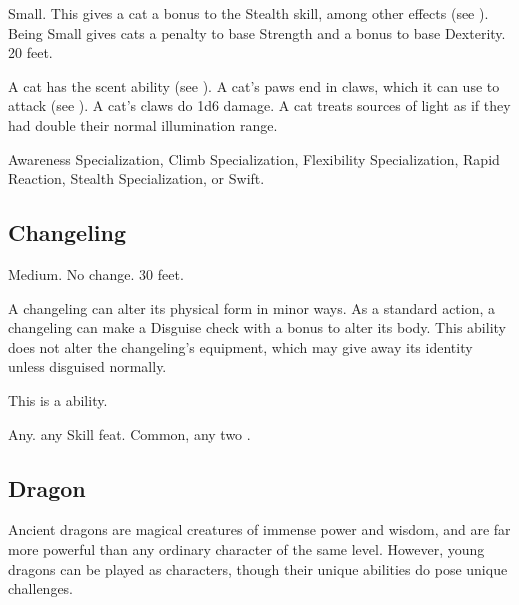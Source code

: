              Small. This gives a cat a  bonus to the Stealth skill, among other effects (see ).
             Being Small gives cats a  penalty to base Strength and a  bonus to base Dexterity.
             20 feet.
            \begin{itemize}
                 A cat has the scent ability (see ).
                 A cat's paws end in claws, which it can use to attack (see ). A cat's claws do 1d6 damage.
                 A cat treats sources of light as if they had double their normal illumination range.
            \end{itemize}
         Awareness Specialization, Climb Specialization, Flexibility Specialization, Rapid Reaction, Stealth Specialization, or Swift.

    \subsection{Changeling}

         Medium.
         No change.
         30 feet.
        \begin{itemize}
             A changeling can alter its physical form in minor ways. As a standard action, a changeling can make a Disguise check with a  bonus to alter its body. This ability does not alter the changeling's equipment, which may give away its identity unless disguised normally.

            This is a  ability.
        \end{itemize}
         Any.
         any Skill feat.
         Common, any two .

    \subsection{Dragon}
        Ancient dragons are magical creatures of immense power and wisdom, and are far more powerful than any ordinary character of the same level.
        However, young dragons can be played as characters, though their unique abilities do pose unique challenges.

